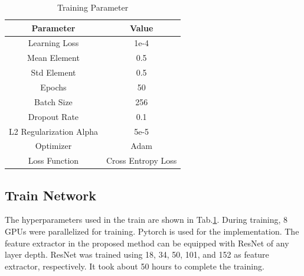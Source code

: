 \begin{table}[htbp]
\begin{center}
\caption{Training Parameter}
  \begin{tabular}{c|c} \hline
    Parameter & Value \\ \hline
    Learning Loss & 1e-4 \\
    Mean Element & 0.5 \\
    Std Element & 0.5 \\
    Epochs & 50 \\
    Batch Size & 256 \\
    Dropout Rate & 0.1 \\
    L2 Regularization Alpha & 5e-5 \\
    Optimizer & Adam \\
    Loss Function & Cross Entropy Loss \\ \hline
  \end{tabular}
  \label{tab:Training_Parameter}
\end{center}
\end{table}

\subsection{Train Network}
The hyperparameters used in the train are shown in Tab.\ref{tab:Training_Parameter}. During training, 8 GPUs were parallelized for training. Pytorch is used for the implementation. The feature extractor in the proposed method can be equipped with ResNet of any layer depth. ResNet was trained using 18, 34, 50, 101, and 152 as feature extractor, respectively. It took about 50 hours to complete the training. 


